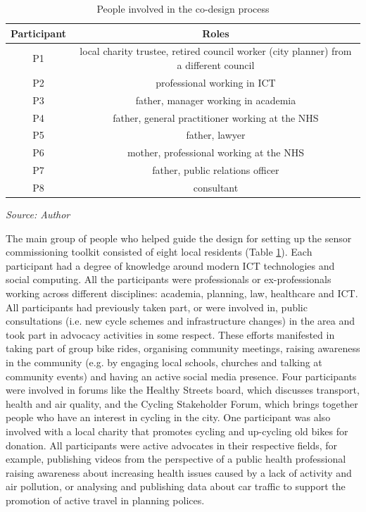 \begin{table}[!hbt]
\scriptsize
\centering
\begin{tabular}{|c|c|}
  \hline
	\textbf{Participant} & \textbf{Roles} \\ [0.5ex]
  \hline
   \rowcolor[gray]{.9} P1 &  local charity trustee, retired council worker (city planner) from a different council \\
   \hline
    P2 &  professional working in ICT  \\
  \hline
   \rowcolor[gray]{.9}  P3 &  father, manager working in academia \\
  \hline
    P4 &  father, general practitioner working at the NHS \\
  \hline
   \rowcolor[gray]{.9}  P5 &  father, lawyer \\
  \hline
    P6 &  mother, professional working at the NHS \\
  \hline
   \rowcolor[gray]{.9}  P7 &  father, public relations officer \\
  \hline
    P8 &  consultant \\ [0.5ex]
  \hline
\end{tabular}

\smallskip\centering
    \footnotesize\emph{Source: Author}
\caption[SenseMyStreet Participants]{People involved in the co-design process}
\label{table:sms_par}
\end{table}

The main group of people who helped guide the design for setting up the sensor commissioning toolkit consisted of eight local residents (Table \ref{table:sms_par}). Each participant had a degree of knowledge around modern ICT technologies and social computing. All the participants were professionals or ex-professionals working across different disciplines: academia, planning, law, healthcare and ICT. All participants had previously taken part, or were involved in, public consultations (i.e. new cycle schemes and infrastructure changes) in the area and took part in advocacy activities in some respect. These efforts manifested in taking part of group bike rides, organising community meetings, raising awareness in the community (e.g. by engaging local schools, churches and talking at community events) and having an active social media presence. Four participants were involved in forums like the Healthy Streets board, which discusses transport, health and air quality, and the Cycling Stakeholder Forum, which brings together people who have an interest in cycling in the city. One participant was also involved with a local charity that promotes cycling and up-cycling old bikes for donation. All participants were active advocates in their respective fields, for example, publishing videos from the perspective of a public health professional raising awareness about increasing health issues caused by a lack of activity and air pollution, or analysing and publishing data about car traffic to support the promotion of active travel in planning polices.

